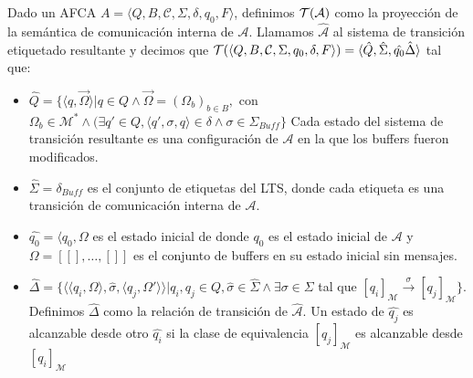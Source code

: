 \begin{definition}\label{def:pci}
Dado un AFCA $A = \langle Q, B, \mathcal{C}, \Sigma, \delta, q_0, F \rangle$, definimos $\mathcal{T}(\mathcal{A})$ como la proyección de la semántica de comunicación interna de $\mathcal{A}$. Llamamos $\hat{\mathcal{A}}$ al sistema de transición etiquetado resultante y decimos que $\mathcal{T} (\langle Q, B, \mathcal{C}, \Sigma, q_0, \delta, F \rangle)= \langle \hat{Q}, \hat{\Sigma}, \hat{q_0} \hat{\Delta} \rangle$ tal que:
\begin{itemize}
    \item $ \hat{Q} = \{ \langle q, \overrightarrow{\Omega} \rangle | q \in Q \land \overrightarrow{\Omega} = (\Omega_b)_{b \in B},$ con $\Omega_b \in \mathcal{M}^* \land (\exists q' \in Q, \langle q', \sigma, q \rangle \in \delta \land \sigma \in \Sigma_{Buff} \}$ Cada estado del sistema de transición resultante es una configuración de $\mathcal{A}$ en la que los buffers fueron modificados.
    
    \item $\hat{\Sigma} = \delta_{Buff} $ es el conjunto de etiquetas del LTS, donde cada etiqueta es una transición de comunicación interna de $\mathcal{A}$.
    
    \item $\hat{q_0}= \langle q_0, \Omega$ es el estado inicial de  donde $q_0$ es el estado inicial de $\mathcal{A}$ y $\Omega = [[], \ldots, []]$ es el conjunto de buffers en su estado inicial sin mensajes.
    
    \item $\hat{\Delta}= \{\langle \langle q_i, \Omega \rangle, \hat{\sigma},\langle q_j, \Omega' \rangle \rangle | q_i,q_j \in Q, \hat{\sigma} \in \hat{\Sigma} \land \exists \sigma \in \Sigma$ tal que  $[q_i]_\mathcal{M} \xrightarrow{\sigma} [q_j]_\mathcal{M} \}$. Definimos $\hat{\Delta}$ como la relación de transición de $\hat{\mathcal{A}}$. Un estado de $\hat{q_j}$ es alcanzable desde otro $\hat{q_i}$ si la clase de equivalencia $[q_j]_\mathcal{M}$ es alcanzable desde $[q_i]_\mathcal{M}$
    
\end{itemize}
\end{definition}


